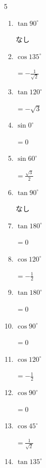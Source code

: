 \begin{multicols}{5}
\begin{enumerate}
  \item $\displaystyle \tan{90^\circ}$

        $\displaystyle なし$

  \item $\displaystyle \cos{135^\circ}$

        $\displaystyle =-\frac{1}{\sqrt{2}}$

  \item $\displaystyle \tan{120^\circ}$

        $\displaystyle =-\sqrt{3}$

  \item $\displaystyle \sin{0^\circ}$

        $\displaystyle =0$

  \item $\displaystyle \sin{60^\circ}$

        $\displaystyle =\frac{\sqrt{3}}{2}$

  \item $\displaystyle \tan{90^\circ}$

        $\displaystyle なし$

  \item $\displaystyle \tan{180^\circ}$

        $\displaystyle =0$

  \item $\displaystyle \cos{120^\circ}$

        $\displaystyle =-\frac{1}{2}$

  \item $\displaystyle \tan{180^\circ}$

        $\displaystyle =0$

\columnbreak %

  \item $\displaystyle \cos{90^\circ}$

        $\displaystyle =0$

  \item $\displaystyle \cos{120^\circ}$

        $\displaystyle =-\frac{1}{2}$

  \item $\displaystyle \cos{90^\circ}$

        $\displaystyle =0$

  \item $\displaystyle \cos{45^\circ}$

        $\displaystyle =\frac{1}{\sqrt{2}}$

  \item $\displaystyle \tan{135^\circ}$


\end{enumerate}
\end{multicols}
